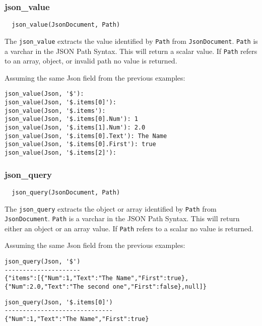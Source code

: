 \subsubsection{json\_value}

\begin{verbatim}
  json_value(JsonDocument, Path)
\end{verbatim}

The \verb`json_value` extracts the value identified by \verb`Path` from
\verb`JsonDocument`.  \verb`Path` is a varchar in the JSON Path Syntax.
This will return a scalar value.  If \verb`Path` refers to an array,
object, or invalid path no value is returned.

Assuming the same Json field from the previous examples:
\begin{verbatim}
json_value(Json, '$'):
json_value(Json, '$.items[0]'):
json_value(Json, '$.items'):
json_value(Json, '$.items[0].Num'): 1
json_value(Json, '$.items[1].Num'): 2.0
json_value(Json, '$.items[0].Text'): The Name
json_value(Json, '$.items[0].First'): true
json_value(Json, '$.items[2]'):
\end{verbatim}


\subsubsection{json\_query}

\begin{verbatim}
  json_query(JsonDocument, Path)
\end{verbatim}

The \verb`json_query` extracts the object or array identified by \verb`Path`
from \verb`JsonDocument`.  \verb`Path` is a varchar in the JSON Path Syntax.
This will return either an object or an array value.  If \verb`Path` refers
to a scalar no value is returned.

Assuming the same Json field from the previous examples:

\verb`json_query(Json, '$')`\\
\verb`---------------------`\\
\verb`{"items":[{"Num":1,"Text":"The Name","First":true},`\split
\verb`{"Num":2.0,"Text":"The second one","First":false},null]}`

\verb`json_query(Json, '$.items[0]')`\\
\verb`------------------------------`\\
\verb`{"Num":1,"Text":"The Name","First":true}`

